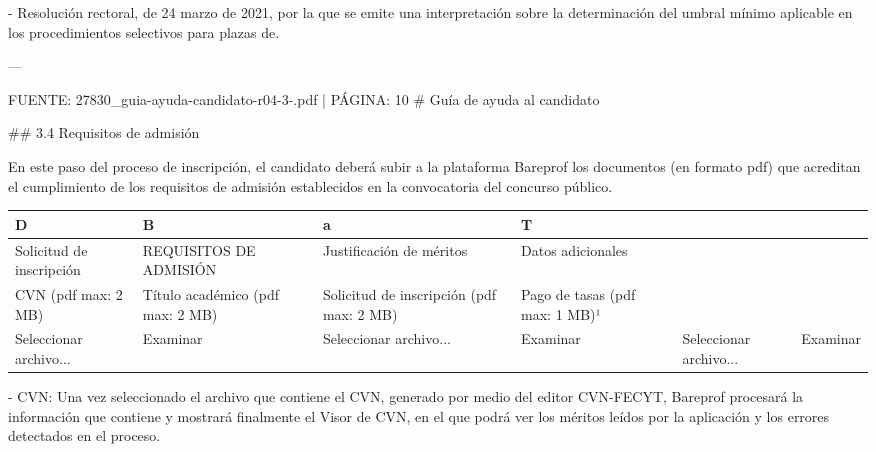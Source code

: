 \documentclass{article}
\begin{document}
\begin{itemize}
\begin{itemize}
\begin{scriptsize}
                  - Resolución rectoral, de 24 marzo de 2021, por la que se emite una interpretación sobre la determinación del umbral mínimo aplicable en los procedimientos selectivos para plazas de.

                  ---

                  FUENTE: 27830\_guia-ayuda-candidato-r04-3-.pdf | PÁGINA: 10
                  \# Guía de ayuda al candidato

                  \#\# 3.4 Requisitos de admisión

                  En este paso del proceso de inscripción, el candidato deberá subir a la plataforma Bareprof los documentos (en formato pdf) que acreditan el cumplimiento de los requisitos de admisión establecidos en la convocatoria del concurso público.

                  \vspace{0.4cm}
                  \begin{table}[h!]\centering\renewcommand{\arraystretch}{1.3}
                    \begin{tabular}{|p{}|p{}|p{}|p{}|p{}|p{}|}\hline
                      D                        & B                                & a                                        & T                              &                        &          \\\hline
                      Solicitud de inscripción & REQUISITOS DE ADMISIÓN           & Justificación de méritos                 & Datos adicionales              &                        &          \\\hline
                      CVN (pdf max: 2 MB)      & Título académico (pdf max: 2 MB) & Solicitud de inscripción (pdf max: 2 MB) & Pago de tasas (pdf max: 1 MB)¹ &                        &          \\\hline
                      Seleccionar archivo...   & Examinar                         & Seleccionar archivo...                   & Examinar                       & Seleccionar archivo... & Examinar \\\hline
                    \end{tabular}\end{table}
                  \vspace{0.4cm}

                  - CVN: Una vez seleccionado el archivo que contiene el CVN, generado por medio del editor CVN-FECYT, Bareprof procesará la información que contiene y mostrará finalmente el Visor de CVN, en el que podrá ver los méritos leídos por la aplicación y los errores detectados en el proceso.


\end{scriptsize}
\end{itemize}
\end{itemize}
\end{document}
